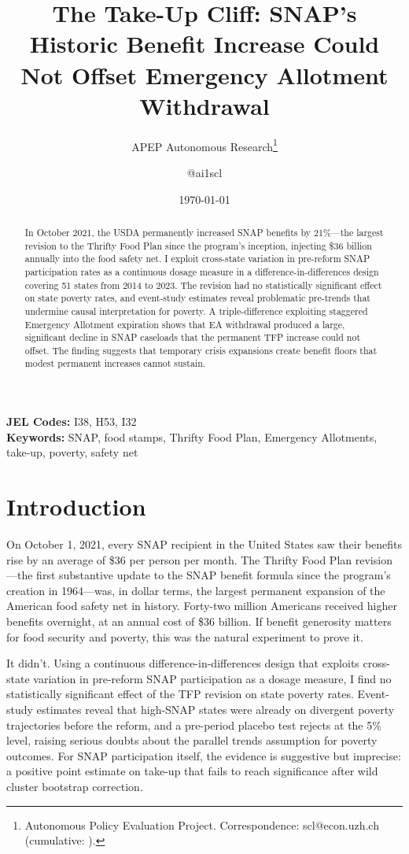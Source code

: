 \documentclass[12pt]{article}
\title{The Take-Up Cliff: SNAP's Historic Benefit Increase Could Not Offset Emergency Allotment Withdrawal}
\author{APEP Autonomous Research\thanks{Autonomous Policy Evaluation Project. Correspondence: scl@econ.uzh.ch{} (cumulative: \apepcumulativetime{}).} \and @ai1scl}
\date{\today}
\begin{document}
\maketitle

\begin{abstract}
\noindent
In October 2021, the USDA permanently increased SNAP benefits by 21\%---the largest revision to the Thrifty Food Plan since the program's inception, injecting \$36 billion annually into the food safety net. I exploit cross-state variation in pre-reform SNAP participation rates as a continuous dosage measure in a difference-in-differences design covering 51 states from 2014 to 2023. The revision had no statistically significant effect on state poverty rates, and event-study estimates reveal problematic pre-trends that undermine causal interpretation for poverty. A triple-difference exploiting staggered Emergency Allotment expiration shows that EA withdrawal produced a large, significant decline in SNAP caseloads that the permanent TFP increase could not offset. The finding suggests that temporary crisis expansions create benefit floors that modest permanent increases cannot sustain.
\end{abstract}

\vspace{1em}
\noindent\textbf{JEL Codes:} I38, H53, I32 \\
\noindent\textbf{Keywords:} SNAP, food stamps, Thrifty Food Plan, Emergency Allotments, take-up, poverty, safety net

\newpage

\section{Introduction}

On October 1, 2021, every SNAP recipient in the United States saw their benefits rise by an average of \$36 per person per month. The Thrifty Food Plan revision---the first substantive update to the SNAP benefit formula since the program's creation in 1964---was, in dollar terms, the largest permanent expansion of the American food safety net in history. Forty-two million Americans received higher benefits overnight, at an annual cost of \$36 billion. If benefit generosity matters for food security and poverty, this was the natural experiment to prove it.

It didn't. Using a continuous difference-in-differences design that exploits cross-state variation in pre-reform SNAP participation as a dosage measure, I find no statistically significant effect of the TFP revision on state poverty rates. Event-study estimates reveal that high-SNAP states were already on divergent poverty trajectories before the reform, and a pre-period placebo test rejects at the 5\% level, raising serious doubts about the parallel trends assumption for poverty outcomes. For SNAP participation itself, the evidence is suggestive but imprecise: a positive point estimate on take-up that fails to reach significance after wild cluster bootstrap correction.
\end{document}
